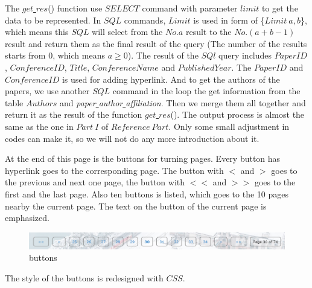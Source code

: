 \documentclass{article}
\begin{document}
	The \(get\)\underline{ }\(res\)() function use \(SELECT\) command with parameter \(limit\) to get the data to be represented. In \(SQL\) commands, \(Limit\) is used in form of \{\(Limit\ a,b\)\}, which means this \(SQL\) will select from the \(No.a\) result to the \(No.(a+b-1)\) result and return them as the final result of the query (The number of the results starts from 0, which means \(a\ge 0\)). The result of the \(SQl\) query includes \(PaperID\), \(ConferenceID\), \(Title\), \(ConferenceName\) and \(Published Year\). The \(PaperID\) and \(ConferenceID\) is used for adding hyperlink. And to get the authors of the papers, we use another \(SQL\) command in the loop the get information from the table \(Authors\) and \emph{paper\underline{ }author\underline{ }affiliation}. Then we merge them all together and return it as the result of the function \(get\)\underline{ }\(res\)(). The output process is almost the same as the one in \(Part\ I\) of \(Reference\ Part\). Only some small adjustment in codes can make it, so we will not do any more introduction about it.
	\par At the end of this page is the buttons for turning pages. Every button has hyperlink goes to the corresponding page. The button with \(<\) and \(>\) goes to the previous and next one page, the button with \(<<\) and \(>>\) goes to the first and the last page. Also ten buttons is listed, which goes to the 10 pages nearby the current page. The text on the button of the current page is emphasized.
	\begin{figure}[H]
		\centering
		\includegraphics[width=0.9\linewidth]{p_25.png}
		\caption{buttons}
	\end{figure}
	The style of the buttons is redesigned with \(CSS\).
\end{document}
